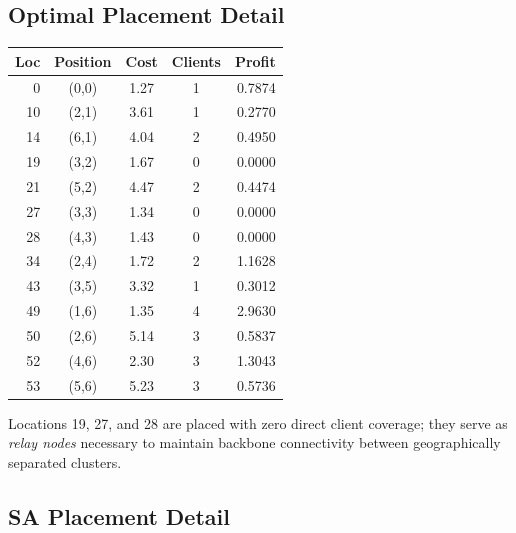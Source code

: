 \documentclass[10pt,a4paper,twocolumn]{article}
\begin{document}
\subsection{Optimal Placement Detail}

\begin{center}
\renewcommand{\arraystretch}{1.15}
\fontsize{7pt}{8.5pt}\selectfont
\begin{tabular}{@{}rcccr@{}}
\toprule
\textbf{Loc} & \textbf{Position} & \textbf{Cost} &
\textbf{Clients} & \textbf{Profit} \\
\midrule
 0  & (0,0) & 1.27 & 1 & 0.7874 \\
10  & (2,1) & 3.61 & 1 & 0.2770 \\
14  & (6,1) & 4.04 & 2 & 0.4950 \\
19  & (3,2) & 1.67 & 0 & 0.0000 \\
21  & (5,2) & 4.47 & 2 & 0.4474 \\
27  & (3,3) & 1.34 & 0 & 0.0000 \\
28  & (4,3) & 1.43 & 0 & 0.0000 \\
34  & (2,4) & 1.72 & 2 & 1.1628 \\
43  & (3,5) & 3.32 & 1 & 0.3012 \\
49  & (1,6) & 1.35 & 4 & 2.9630 \\
50  & (2,6) & 5.14 & 3 & 0.5837 \\
52  & (4,6) & 2.30 & 3 & 1.3043 \\
53  & (5,6) & 5.23 & 3 & 0.5736 \\
\bottomrule
\end{tabular}
\end{center}

\noindent Locations 19, 27, and 28 are placed with zero direct client
coverage; they serve as \emph{relay nodes} necessary to maintain backbone
connectivity between geographically separated clusters.

\subsection{SA Placement Detail}
\end{document}

